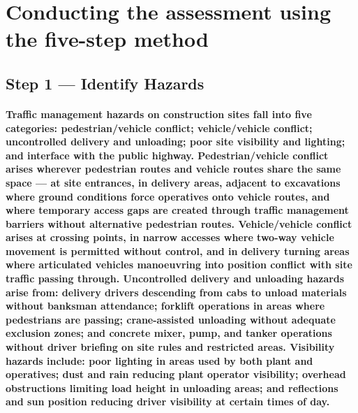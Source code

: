 \begin{itemize}
\end{itemize}

\section{Conducting the assessment using the five-step method}

\subsection{Step 1 --- Identify Hazards}
\paragraph{Traffic management hazards on construction sites fall into five categories: pedestrian/vehicle conflict; vehicle/vehicle conflict; uncontrolled delivery and unloading; poor site visibility and lighting; and interface with the public highway. Pedestrian/vehicle conflict arises wherever pedestrian routes and vehicle routes share the same space --- at site entrances, in delivery areas, adjacent to excavations where ground conditions force operatives onto vehicle routes, and where temporary access gaps are created through traffic management barriers without alternative pedestrian routes. Vehicle/vehicle conflict arises at crossing points, in narrow accesses where two-way vehicle movement is permitted without control, and in delivery turning areas where articulated vehicles manoeuvring into position conflict with site traffic passing through. Uncontrolled delivery and unloading hazards arise from: delivery drivers descending from cabs to unload materials without banksman attendance; forklift operations in areas where pedestrians are passing; crane-assisted unloading without adequate exclusion zones; and concrete mixer, pump, and tanker operations without driver briefing on site rules and restricted areas. Visibility hazards include: poor lighting in areas used by both plant and operatives; dust and rain reducing plant operator visibility; overhead obstructions limiting load height in unloading areas; and reflections and sun position reducing driver visibility at certain times of day.}


